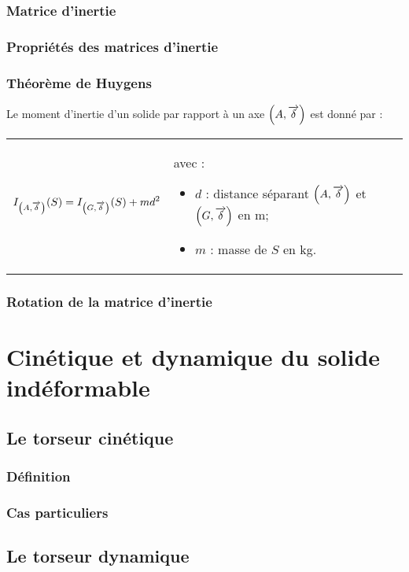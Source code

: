 \documentclass[10pt,fleqn]{article} %
\begin{document}
\subsubsection{Matrice d'inertie}

\subsubsection{Propriétés des matrices d'inertie}
\subsubsection{Théorème de Huygens}
\begin{theorem}
Le moment d'inertie d'un solide par rapport à un axe  $\left(A,\overrightarrow{\delta}\right)$ est donné par :

\begin{tabular}{m{.45\linewidth}m{.45\linewidth}}
$$I_{\left(A,\overrightarrow{\delta}\right)}(S)=I_{\left(G,\overrightarrow{\delta}\right)}(S)+md^2 $$ & 
avec :
\begin{itemize}
\item $d$ : distance séparant $\left(A,\overrightarrow{\delta}\right)$ et $\left(G,\overrightarrow{\delta}\right)$ en m;
\item $m$ : masse de $S$ en kg.
\end{itemize}
\end{tabular}
\end{theorem}
\subsubsection{Rotation de la matrice d'inertie}

\section{Cinétique et dynamique du solide indéformable}
\subsection{Le torseur cinétique}
\subsubsection{Définition}
\subsubsection{Cas particuliers}

\subsection{Le torseur dynamique}
\end{document}

